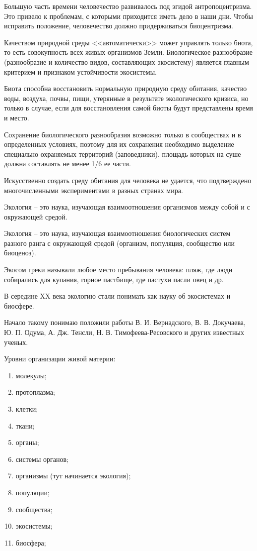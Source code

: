 \documentclass[a5paper, 11pt]{extarticle}
\theoremstyle{definition}
\theoremstyle{definition}
\theoremstyle{definition}
\numberwithin{figure}{section}
\begin{document}
Большую часть времени человечество развивалось под эгидой антропоцентризма. Это привело к проблемам, с которыми приходится иметь дело в наши дни. Чтобы исправить положение, человечество должно придерживаться биоцентризма.

Качеством природной среды <<автоматически>> может управлять только биота, то есть совокупность всех живых организмов Земли. Биологическое разнообразие (разнообразие и количество видов, составляющих экосистему) является главным критерием и признаком устойчивости экосистемы.

Биота способна восстановить нормальную природную среду обитания, качество воды, воздуха, почвы, пищи, утерянные в результате экологического кризиса, но только в случае, если для восстановления самой биоты будут представлены время и место.

Сохранение биологического разнообразия возможно только в сообществах и в определенных условиях, поэтому для их сохранения необходимо выделение специально охраняемых территорий (заповедники), площадь которых на суше должна составлять не менее 1/6 ее части.

Искусственно создать среду обитания для человека не удается, что подтверждено многочисленными экспериментами в разных странах мира.

Экология -- это наука, изучающая взаимоотношения организмов между собой и с окружающей средой.

Экология -- это наука, изучающая взаимоотношения биологических систем разного ранга с окружающей средой (организм, популяция, сообщество или биоценоз).

Экосом греки называли любое место пребывания человека: пляж, где люди собирались для купания, горное пастбище, где пастухи пасли овец и др.

В середине XX века экологию стали понимать как науку об экосистемах и биосфере.

Начало такому понимаю положили работы В. И. Вернадского, В. В. Докучаева, Ю. П. Одума, А. Дж. Тенсли, Н. В. Тимофеева-Ресовского и других известных ученых.

Уровни организации живой материи:
\begin{enumerate}
    \item молекулы;
    \item протоплазма;
    \item клетки;
    \item ткани;
    \item органы;
    \item системы органов;
    \item организмы (тут начинается экология);
    \item популяции;
    \item сообщества;
    \item экосистемы;
    \item биосфера;
\end{enumerate}
\end{document}
